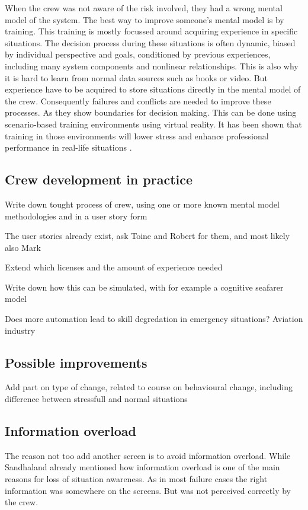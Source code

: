 When the crew was not aware of the risk involved, they had a wrong mental model of the system. The best way to improve someone's mental model is by training. This training is mostly focussed around acquiring experience in specific situations. The decision process during these situations is often dynamic, biased by individual perspective and goals, conditioned by previous experiences, including many system components and nonlinear relationships. This is also why it is hard to learn from normal data sources such as books or video. But experience have to be acquired to store situations directly in the mental model of the crew. Consequently failures and conflicts are needed to improve these processes. As they show boundaries for decision making. This can be done using scenario-based training environments using virtual reality. It has been shown that training in those environments will lower stress and enhance professional performance in real-life situations \cite{Ford1998} \cite{Cohen2016}.

\subsection{Crew development in practice}	
Write down tought process of crew, using one or more known mental model methodologies and in a user story form

The user stories already exist, ask Toine and Robert for them, and most likely also Mark

Extend which licenses and the amount of experience needed

Write down how this can be simulated, with for example a cognitive seafarer model

Does more automation lead to skill degredation in emergency situations? Aviation industry


\subsection{Possible improvements}
Add part on type of change, related to course on behavioural change, including difference between stressfull and normal situations

\subsection{Information overload}
The reason not too add another screen is to avoid information overload. While Sandhaland already mentioned how information overload is one of the main reasons for loss of situation awareness. As in most failure cases the right information was somewhere on the screens. But was not perceived correctly by the crew.


